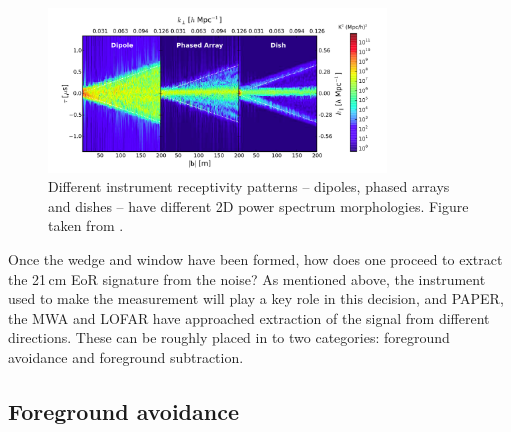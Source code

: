 \begin{figure}
\centering
\includegraphics[width=0.8\textwidth]{chapters/eor_window_theory/figures/nithyaWedge.png}
\caption[Different instrument receptivity patterns -- dipoles, phased arrays and dishes -- have different 2D power spectrum morphologies.]{Different instrument receptivity patterns -- dipoles, phased arrays and dishes -- have different 2D power spectrum morphologies. Figure taken from \cite{Nithya.15b}.}
\label{fig:eor_theory_nithya_pitchforks}
\end{figure}

Once the wedge and window have been formed, how does one proceed to extract the 21\,cm EoR signature from the noise? As mentioned above, the instrument used to make the measurement will play a key role in this decision, and PAPER, the MWA and LOFAR have approached extraction of the signal from different directions. These can be roughly placed in to two categories: foreground avoidance and foreground subtraction.

\subsection{Foreground avoidance}

